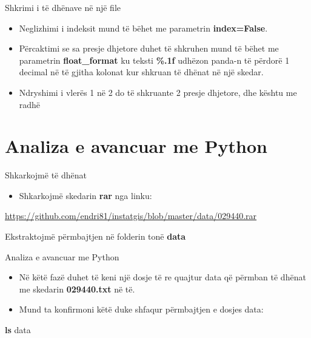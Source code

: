 \documentclass[
  ignorenonframetext,
]{beamer}
\newenvironment{Shaded}{\begin{snugshade}}{\end{snugshade}}
\newcommand{\FunctionTok}[1]{\textcolor[rgb]{0.13,0.29,0.53}{\textbf{#1}}}
\newcommand{\NormalTok}[1]{#1}
\providecommand{\tightlist}{%
  \setlength{\itemsep}{0pt}\setlength{\parskip}{0pt}}
\begin{document}
\begin{frame}{Shkrimi i të dhënave në një file}
\protect\hypertarget{shkrimi-i-tuxeb-dhuxebnave-nuxeb-njuxeb-file-5}{}
\begin{itemize}
\item
  Neglizhimi i indeksit mund të bëhet me parametrin
  \textbf{index=False}.
\item
  Përcaktimi se sa presje dhjetore duhet të shkruhen mund të bëhet me
  parametrin \textbf{float\_format} ku teksti \textbf{\%.1f} udhëzon
  panda-n të përdorë 1 decimal në të gjitha kolonat kur shkruan të
  dhënat në një skedar.
\item
  Ndryshimi i vlerës 1 në 2 do të shkruante 2 presje dhjetore, dhe
  kështu me radhë
\end{itemize}
\end{frame}

\hypertarget{analiza-e-avancuar-me-python}{%
\section{Analiza e avancuar me
Python}\label{analiza-e-avancuar-me-python}}

\begin{frame}{Shkarkojmë të dhënat}
\protect\hypertarget{shkarkojmuxeb-tuxeb-dhuxebnat}{}
\begin{itemize}
\tightlist
\item
  Shkarkojmë skedarin \textbf{rar} nga linku:
\end{itemize}

\url{https://github.com/endri81/instatgis/blob/master/data/029440.rar}

Ekstraktojmë përmbajtjen në folderin tonë \textbf{data}
\end{frame}

\begin{frame}[fragile]{Analiza e avancuar me Python}
\protect\hypertarget{analiza-e-avancuar-me-python-1}{}
\begin{itemize}
\item
  Në këtë fazë duhet të keni një dosje të re quajtur data që përmban të
  dhënat me skedarin \textbf{029440.txt} në të.
\item
  Mund ta konfirmoni këtë duke shfaqur përmbajtjen e dosjes data:
\end{itemize}

\begin{Shaded}
\begin{Highlighting}[]
\FunctionTok{ls}\NormalTok{ data}
\end{Highlighting}
\end{Shaded}
\end{frame}
\end{document}
